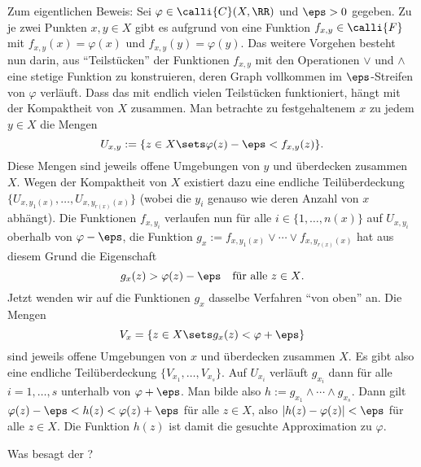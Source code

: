 \begin{antwort}
  \medskip
  Zum eigentlichen Beweis: Sei $\varphi \in \calli{C}(X,\RR)$ 
  und $\eps>0$ gegeben. Zu je zwei Punkten $x,y \in X$ gibt es aufgrund 
  von  eine Funktion $f_{x,y}\in \calli{F}$ mit 
  $f_{x,y}(x)=\varphi(x)$ und $f_{x,y}(y)=\varphi(y)$. Das weitere Vorgehen 
  besteht nun darin, aus "`Teilstücken"' der Funktionen $f_{x,y}$ mit 
  den Operationen $\vee$ und $\wedge$ eine stetige Funktion zu konstruieren, 
  deren Graph vollkommen im $\eps$-Streifen von $\varphi$ verläuft. Dass das 
  mit endlich vielen Teilstücken funktioniert, hängt mit der Kompaktheit von 
  $X$ zusammen.   
  Man betrachte zu festgehaltenem $x$ zu jedem $y \in X$ die Mengen 
  \[
  U_{x,y} := \{ z\in X\sets \varphi(z)-\eps < f_{x,y}(z) \}.
  \]
  Diese Mengen 
  sind jeweils offene Umgebungen von $y$ und überdecken zusammen $X$. 
  Wegen der Kompaktheit von $X$ existiert dazu eine endliche Teilüberdeckung 
  $\{ U_{x,y_1(x)}, \ldots , U_{x,y_{r(x)}(x)} \}$ (wobei die $y_i$ genauso 
  wie deren Anzahl von $x$ abhängt). Die Funktionen $f_{x,y_i}$ verlaufen  
  nun für alle $i\in\{ 1,\ldots, n(x) \}$ 
  auf $U_{x,{y_i}}$ oberhalb von $\varphi-\eps$, die Funktion 
  $g_x := f_{x,y_1(x)}\vee \cdots \vee f_{x,y_{r(x)}(x)}$ hat aus 
  diesem Grund die Eigenschaft 
  \[
  g_x(z) > \varphi(z)-\eps \quad\text{für alle $z\in X$.}
  \]
  Jetzt wenden wir auf die Funktionen 
  $g_x$ dasselbe Verfahren "`von oben"' an. 
  Die Mengen 
  \[
  V_x = \{ z\in X\sets g_x(z)< \varphi+\eps \}
  \] 
  sind jeweils offene Umgebungen von $x$ und überdecken zusammen $X$. 
  Es gibt also eine endliche Teilüberdeckung $\{ V_{x_1}, \ldots, V_{x_s} \}$. 
  Auf $U_{x_i}$ verläuft $g_{x_i}$ dann für alle $i=1,\ldots,s$ 
  unterhalb von $\varphi+\eps$. Man bilde also 
  $h := g_{x_1} \wedge \cdots \wedge g_{x_s} $. 
  Dann gilt $\varphi(z)-\eps < h(z) < \varphi(z)+\eps$ für alle 
  $z\in X$, also $\left| h(z)-\varphi(z) \right| < \eps$ für alle 
  $z\in X$. Die Funktion $h(z)$ ist damit die gesuchte Approximation 
  zu $\varphi$. \AntEnd
\end{antwort}

\begin{frage}
  Was besagt der ?
\end{frage}

